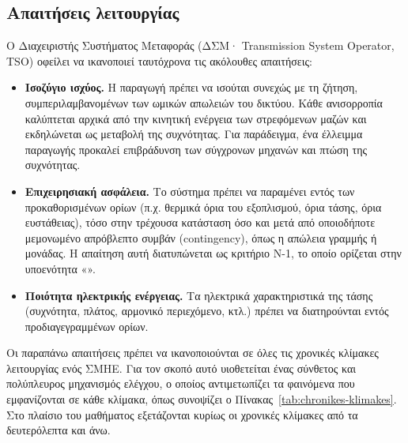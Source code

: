 

\subsection{Απαιτήσεις λειτουργίας}

Ο Διαχειριστής Συστήματος Μεταφοράς (ΔΣΜ· Transmission System Operator, TSO) οφείλει να
ικανοποιεί ταυτόχρονα τις ακόλουθες απαιτήσεις:

\begin{itemize}
\item \textbf{Ισοζύγιο ισχύος.} Η παραγωγή πρέπει να ισούται συνεχώς με τη ζήτηση, συμπεριλαμβανομένων των ωμικών απωλειών του δικτύου. Κάθε ανισορροπία καλύπτεται αρχικά από την κινητική ενέργεια των στρεφόμενων μαζών και εκδηλώνεται ως μεταβολή της συχνότητας. Για παράδειγμα, ένα
      έλλειμμα παραγωγής προκαλεί επιβράδυνση των σύγχρονων μηχανών και πτώση της συχνότητας.
\item \textbf{Επιχειρησιακή ασφάλεια.} Το σύστημα πρέπει να παραμένει εντός των προκαθορισμένων ορίων (π.χ. θερμικά όρια του εξοπλισμού, όρια τάσης, όρια ευστάθειας), τόσο στην τρέχουσα κατάσταση όσο και μετά από οποιοδήποτε μεμονωμένο απρόβλεπτο συμβάν (contingency), όπως η απώλεια γραμμής ή μονάδας. Η απαίτηση αυτή διατυπώνεται ως κριτήριο N-1, το οποίο ορίζεται στην υποενότητα
      «».
\item \textbf{Ποιότητα ηλεκτρικής ενέργειας.} Τα ηλεκτρικά χαρακτηριστικά της τάσης (συχνότητα, πλάτος, αρμονικό περιεχόμενο, κτλ.) πρέπει να
      διατηρούνται εντός προδιαγεγραμμένων ορίων.
\end{itemize}

Οι παραπάνω απαιτήσεις πρέπει να ικανοποιούνται σε όλες τις χρονικές κλίμακες λειτουργίας ενός
ΣΜΗΕ. Για τον σκοπό αυτό υιοθετείται ένας σύνθετος και πολύπλευρος μηχανισμός ελέγχου, ο οποίος
αντιμετωπίζει τα φαινόμενα που εμφανίζονται σε κάθε κλίμακα, όπως συνοψίζει ο
Πίνακας~\ref{tab:chronikes-klimakes}. Στο πλαίσιο του μαθήματος εξετάζονται κυρίως οι χρονικές
κλίμακες από τα δευτερόλεπτα και άνω.

